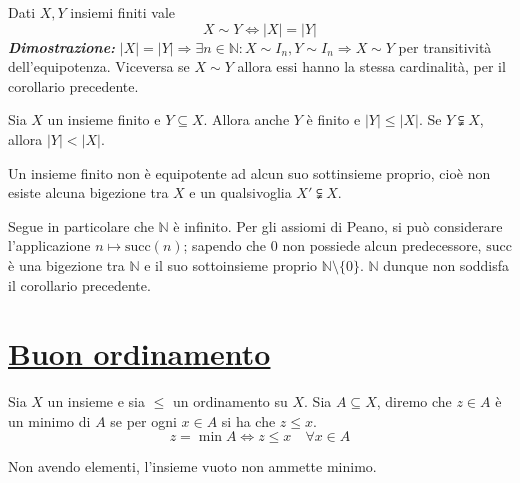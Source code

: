 \begin{tcolorbox}[title={Condizione di equipotenza espressa in termini di cardinalità}]
Dati $X,Y$ insiemi finiti vale
\[ X\sim Y \Longleftrightarrow |X|=|Y| \]
\textit{\textbf{Dimostrazione:}} $|X|=|Y|\Longrightarrow \exists n\in\mathbb{N}:
X\sim I_n, Y\sim I_n\Longrightarrow X\sim Y$ per transitività dell'equipotenza.
Viceversa se $X\sim Y$ allora essi hanno la stessa cardinalità, per il
corollario precedente.
\end{tcolorbox}

\begin{tcolorbox}[title={Cardinalità di sottoinsiemi finiti}]
Sia $X$ un insieme finito e $Y\subseteq X$. Allora anche
$Y$ è finito e $|Y|\leq|X|$. Se $Y\subsetneqq X$, allora
$|Y|<|X|$.
\end{tcolorbox}

\begin{tcolorbox}[colback=green!30, colframe=green!30!black, title={Equipotenza tra insieme finito e sottoinsieme}]
Un insieme finito non è equipotente ad alcun suo sottinsieme proprio,
cioè non esiste alcuna bigezione tra $X$ e un qualsivoglia $X'\subsetneqq X$.
\end{tcolorbox}

\begin{osservaz}
Segue in particolare che $\mathbb{N}$ è
infinito. Per gli assiomi di Peano, si può considerare
l'applicazione $n\mapsto \text{succ}(n)$; sapendo che 0 non
possiede alcun predecessore, $\text{succ}$ è una bigezione
tra $\mathbb{N}$ e il suo sottoinsieme proprio $\mathbb{N}\setminus\{0\}$.
$\mathbb{N}$ dunque non soddisfa il corollario precedente.
\end{osservaz}





\section{\underline{Buon ordinamento}}
\begin{tcolorbox}[colback=yellow!30, colframe=yellow!30!black, title=Minimo]
Sia $X$ un insieme e sia $\leq$ un ordinamento su $X$. Sia $A \subseteq X$, diremo
che $z \in A$ è un minimo di $A$ se per ogni $x \in A$ si ha che $z \leq x$.
\[ z = \min A \Longleftrightarrow z \leq x \quad \forall x \in A \]
\end{tcolorbox}

\begin{osservaz}
Non avendo elementi, l'insieme vuoto non ammette minimo.
\end{osservaz}

